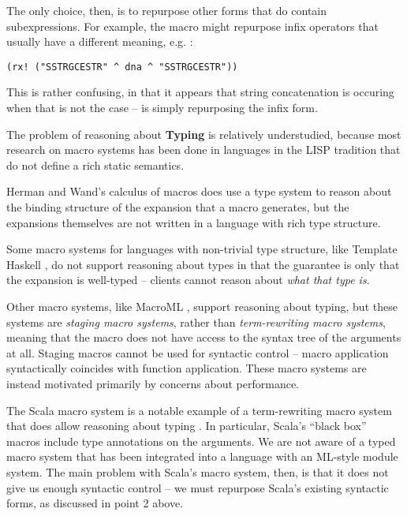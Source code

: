 {{\begin{enumerate}
The only choice, then, is to repurpose other forms that do contain subexpressions. For example, the macro might repurpose infix operators that usually have a different meaning, e.g. \li{^}:
\begin{lstlisting}[numbers=none]
(rx! ("SSTRGCESTR" ^ dna ^ "SSTRGCESTR"))
\end{lstlisting}
This is rather confusing, in that it appears that string concatenation is occuring when that is not the case --  is simply repurposing the infix \li{^} form.
\end{enumerate}

The problem of reasoning about \textbf{Typing} is relatively understudied, because most research on macro systems has been done in languages in the LISP tradition that do not define a rich static semantics. 

Herman and Wand's calculus of macros \cite{DBLP:conf/esop/HermanW08,Herman10:Theory} does use a type system to reason about the binding structure of the expansion that a macro generates, but the expansions themselves are not written in a language with rich type structure. 

Some macro systems for languages with non-trivial type structure, like Template Haskell \cite{SheardPeytonJones:Haskell-02}, do not support reasoning about types in that the guarantee is only that the expansion is well-typed -- clients cannot reason about \emph{what that type is}. 

Other macro systems, like MacroML \cite{ganz2001macros,Sheard:1999:UMS}, support reasoning about typing, but these systems are \emph{staging macro systems}, rather than \emph{term-rewriting macro systems}, meaning that the macro does not have access to the syntax tree of the arguments at all. Staging macros cannot be used for syntactic control -- macro application syntactically coincides with function application. These macro systems are instead motivated primarily by concerns about performance.

The Scala macro system is a notable example of a term-rewriting macro system that does allow reasoning about typing \cite{ScalaMacros2013}. In particular, Scala's ``black box'' macros include type annotations on the arguments. We are not aware of a typed macro system that has been integrated into a language with an ML-style module system. The main problem with Scala's macro system, then, is that it does not give us enough syntactic control -- we must repurpose Scala's existing syntactic forms, as discussed in point 2 above.

}}
